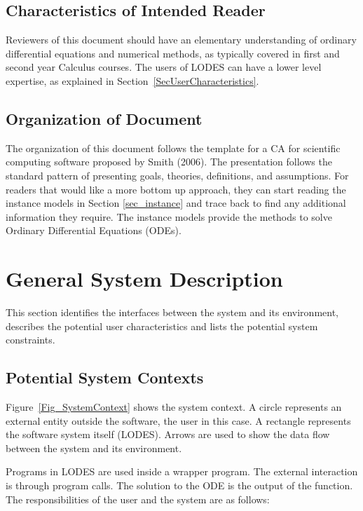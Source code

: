 \documentclass[12pt]{article}
\newcommand{\famname}{LODES} %
\begin{document}
\subsection{Characteristics of Intended Reader}
Reviewers of this document should have an elementary understanding of ordinary differential
equations and numerical methods, as typically covered in first and second year Calculus courses.
The users of \famname{} can have a lower level expertise, as explained in
Section~\ref{SecUserCharacteristics}.

\subsection{Organization of Document}
The organization of this document follows the template for a CA for scientific
computing software proposed by Smith (2006). The presentation follows the standard
pattern of presenting goals, theories, definitions, and assumptions. For readers that would
like a more bottom up approach, they can start reading the instance models in Section
\ref{sec_instance} and trace back to find any additional information they require.  The
instance models provide the methods to solve Ordinary Differential Equations (ODEs).

\section{General System Description}

This section identifies the interfaces between the system and its environment,
describes the potential user characteristics and lists the potential system
constraints.

\subsection{Potential System Contexts}

Figure~\ref{Fig_SystemContext} shows the system context.  A circle represents an
external entity outside the software, the user in this case.  A rectangle
represents the software system itself (\famname{}).  Arrows are used to show the data
flow between the system and its environment.

Programs in \famname{} are used inside a wrapper program.  The external interaction is through
program calls. The solution to the ODE is the output of the function.  The responsibilities of
the user and the system are as follows:
\end{document}
